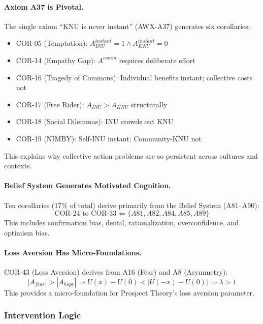 \paragraph{Axiom A37 is Pivotal.}
The single axiom ``KNU is never instant'' (AWX-A37) generates six corollaries:
\begin{itemize}
\item COR-05 (Temptation): $A_{INU}^{instant} = 1 \land A_{KNU}^{instant} = 0$
\item COR-14 (Empathy Gap): $A^{comm}$ requires deliberate effort
\item COR-16 (Tragedy of Commons): Individual benefits instant; collective costs not
\item COR-17 (Free Rider): $A_{INU} > A_{KNU}$ structurally
\item COR-18 (Social Dilemmas): INU crowds out KNU
\item COR-19 (NIMBY): Self-INU instant; Community-KNU not
\end{itemize}
This explains why collective action problems are so persistent across cultures and contexts.

\paragraph{Belief System Generates Motivated Cognition.}
Ten corollaries (17\% of total) derive primarily from the Belief System (A81--A90):
\begin{equation}
\text{COR-24 to COR-33} \Leftarrow \{A81, A82, A84, A85, A89\}
\end{equation}
This includes confirmation bias, denial, rationalization, overconfidence, and optimism bias.

\paragraph{Loss Aversion Has Micro-Foundations.}
COR-43 (Loss Aversion) derives from A16 (Fear) and A8 (Asymmetry):
\begin{equation}
|A_{fear}| > |A_{hope}| \Rightarrow U(x) - U(0) < |U(-x) - U(0)| \Rightarrow \lambda > 1
\end{equation}
This provides a micro-foundation for Prospect Theory's loss aversion parameter.

\subsubsection{Intervention Logic}

